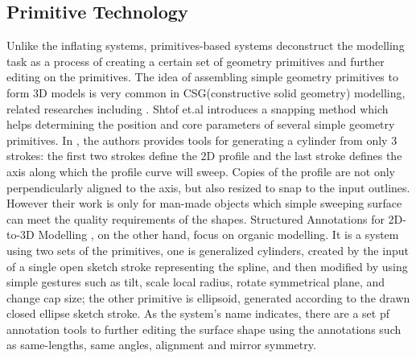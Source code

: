 \documentclass[10pt,twocolumn,letterpaper]{article}
\begin{document}
\subsection{Primitive Technology}
Unlike the inflating systems, primitives-based systems deconstruct the modelling task as a process of creating a certain set of geometry primitives and further editing on the primitives. The idea of assembling simple geometry primitives to form 3D models is very common in CSG(constructive solid geometry) modelling, related researches including \cite{shtof2013geosemantic,chen20133}. Shtof et.al \cite{shtof2013geosemantic} introduces a snapping method which helps determining the position and core parameters of several simple geometry primitives. In \cite{chen20133}, the authors provides tools for generating a cylinder from only 3 strokes: the first two strokes define the 2D profile and the last stroke defines the axis along which the profile curve will sweep. Copies of the profile are not only perpendicularly aligned to the axis, but also resized to snap to the input outlines. However their work is only for man-made objects which simple sweeping surface can meet the quality requirements of the shapes. Structured Annotations for 2D-to-3D Modelling \cite{gingold2009structured}, on the other hand, focus on organic modelling. It is a system using two sets of the primitives, one is generalized cylinders, created by the input of a single open sketch stroke representing the spline, and then modified by using simple gestures such as tilt, scale local radius, rotate symmetrical plane, and change cap size; the other primitive is ellipsoid, generated according to the drawn closed ellipse sketch stroke. As the system's name indicates, there are a set pf annotation tools to further editing the surface shape using the annotations such as same-lengths, same angles, alignment and mirror symmetry. \\
\end{document}
